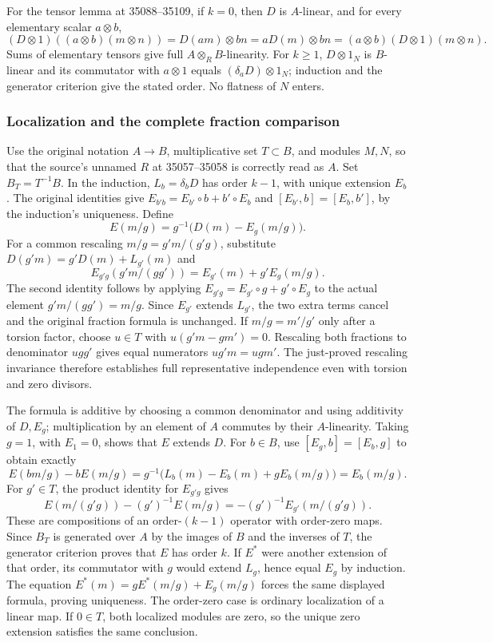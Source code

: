 For the tensor lemma at 35088--35109, if \(k=0\), then \(D\) is \(A\)-linear, and for every elementary scalar \(a\otimes b\), \[
(D\otimes1)((a\otimes b)(m\otimes n))=D(am)\otimes bn
=aD(m)\otimes bn=(a\otimes b)(D\otimes1)(m\otimes n).
\] Sums of elementary tensors give full \(A\otimes_RB\)-linearity. For \(k\ge1\), \(D\otimes1_N\) is \(B\)-linear and its commutator with \(a\otimes1\) equals \((\delta_aD)\otimes1_N\); induction and the generator criterion give the stated order. No flatness of \(N\) enters.

\subsubsection{Localization and the complete fraction comparison}\label{algebra-proof-043-localization-and-the-complete-fraction-comparison}

Use the original notation \(A\to B\), multiplicative set \(T\subset B\), and modules \(M,N\), so that the source's unnamed \(R\) at 35057--35058 is correctly read as \(A\). Set \(B_T=T^{-1}B\). In the induction, \(L_b=\delta_bD\) has order \(k-1\), with unique extension \(E_b\). The original identities give \(E_{b'b}=E_{b'}\circ b+b'\circ E_b\) and \([E_{b'},b]=[E_b,b']\), by the induction's uniqueness. Define \[
E(m/g)=g^{-1}\bigl(D(m)-E_g(m/g)\bigr).
\] For a common rescaling \(m/g=g'm/(g'g)\), substitute \(D(g'm)=g'D(m)+L_{g'}(m)\) and \[
E_{g'g}(g'm/(gg'))=E_{g'}(m)+g'E_g(m/g).
\] The second identity follows by applying \(E_{g'g}=E_{g'}\circ g+g'\circ E_g\) to the actual element \(g'm/(gg')=m/g\). Since \(E_{g'}\) extends \(L_{g'}\), the two extra terms cancel and the original fraction formula is unchanged. If \(m/g=m'/g'\) only after a torsion factor, choose \(u\in T\) with \(u(g'm-gm')=0\). Rescaling both fractions to denominator \(ugg'\) gives equal numerators \(ug'm=ugm'\). The just-proved rescaling invariance therefore establishes full representative independence even with torsion and zero divisors.

The formula is additive by choosing a common denominator and using additivity of \(D,E_g\); multiplication by an element of \(A\) commutes by their \(A\)-linearity. Taking \(g=1\), with \(E_1=0\), shows that \(E\) extends \(D\). For \(b\in B\), use \([E_g,b]=[E_b,g]\) to obtain exactly \[
E(bm/g)-bE(m/g)
=g^{-1}\bigl(L_b(m)-E_b(m)+gE_b(m/g)\bigr)=E_b(m/g).
\] For \(g'\in T\), the product identity for \(E_{g'g}\) gives \[
E(m/(g'g))-(g')^{-1}E(m/g)=-(g')^{-1}E_{g'}(m/(g'g)).
\] These are compositions of an order-\((k-1)\) operator with order-zero maps. Since \(B_T\) is generated over \(A\) by the images of \(B\) and the inverses of \(T\), the generator criterion proves that \(E\) has order \(k\). If \(E^*\) were another extension of that order, its commutator with \(g\) would extend \(L_g\), hence equal \(E_g\) by induction. The equation \(E^*(m)=gE^*(m/g)+E_g(m/g)\) forces the same displayed formula, proving uniqueness. The order-zero case is ordinary localization of a linear map. If \(0\in T\), both localized modules are zero, so the unique zero extension satisfies the same conclusion.

